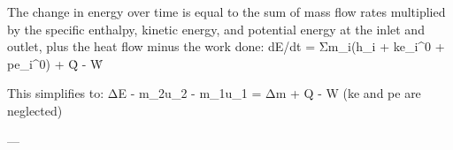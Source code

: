 The change in energy over time is equal to the sum of mass flow rates multiplied by the specific enthalpy, kinetic energy, and potential energy at the inlet and outlet, plus the heat flow minus the work done:  
dE/dt = Σm_i(h_i + ke_i^0 + pe_i^0) + Q̇ - Ẇ  

This simplifies to:  
ΔE - m_2u_2 - m_1u_1 = Δm + Q - W  
(ke and pe are neglected)

---
